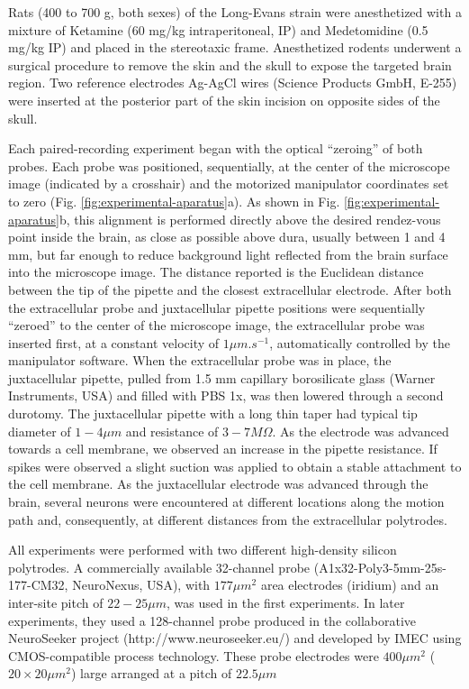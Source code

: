 Rats (400 to 700 g, both sexes) of the Long-Evans strain were anesthetized with a mixture of Ketamine (60 mg/kg intraperitoneal, IP) and Medetomidine (0.5 mg/kg IP) and placed in the stereotaxic frame. Anesthetized rodents underwent a surgical procedure to remove the skin and the skull to expose the targeted brain region. Two reference electrodes Ag-AgCl wires (Science Products GmbH, E-255) were inserted at the posterior part of the skin incision on opposite sides of the skull.

Each paired-recording experiment began with the optical “zeroing” of both probes. Each probe was positioned, sequentially, at the center of the microscope image (indicated by a crosshair) and the motorized manipulator coordinates set to zero (Fig. \ref{fig:experimental-aparatus}a). As shown in Fig. \ref{fig:experimental-aparatus}b, this alignment is performed directly above the desired rendez-vous point inside the brain, as close as possible above dura, usually between 1 and 4 mm, but far enough to reduce background light reflected from the brain surface into the microscope image. The distance reported is the Euclidean distance between the tip of the pipette and the closest extracellular electrode. After both the extracellular probe and juxtacellular pipette positions were sequentially “zeroed” to the center of the microscope image, the extracellular probe was inserted first, at a constant velocity of $1 \mu m.s^{-1}$, automatically controlled by the manipulator software. When the extracellular probe was in place, the juxtacellular pipette, pulled from 1.5 mm capillary borosilicate glass (Warner Instruments, USA) and filled with PBS 1x, was then lowered through a second durotomy. The juxtacellular pipette with a long thin taper had typical tip diameter of $1-4 \mu m$ and resistance of $3-7 M\Omega$. As the electrode was advanced towards a cell membrane, we observed an increase in the pipette resistance. If spikes were observed a slight suction was applied to obtain a stable attachment to the cell membrane. As the juxtacellular electrode was advanced through the brain, several neurons were encountered at different locations along the motion path and, consequently, at different distances from the extracellular polytrodes.

All experiments were performed with two different high-density silicon polytrodes. A commercially available 32-channel probe (A1x32-Poly3-5mm-25s-177-CM32, NeuroNexus, USA), with $177 \mu m^2$ area electrodes (iridium) and an inter-site pitch of $22-25 \mu m$, was used in the first experiments. In later experiments, they used a 128-channel probe produced in the collaborative NeuroSeeker project (http://www.neuroseeker.eu/) and developed by IMEC using CMOS-compatible process technology. These probe electrodes were $400 \mu m^2$ ($20 \times 20 \mu m^2$) large arranged at a pitch of $22.5 \mu m$


